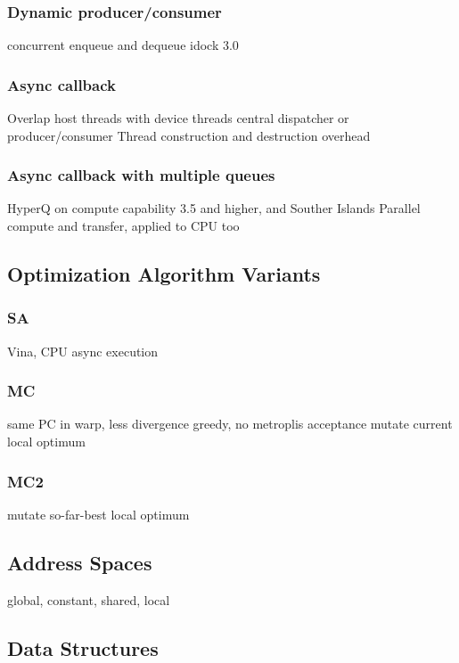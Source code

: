 \documentclass[10pt, conference, compsocconf]{../IEEEtran}
\begin{document}
\subsubsection{Dynamic producer/consumer}
concurrent enqueue and dequeue
idock 3.0

\subsubsection{Async callback}
Overlap host threads with device threads
central dispatcher or producer/consumer
Thread construction and destruction overhead

\subsubsection{Async callback with multiple queues}
HyperQ on compute capability 3.5 and higher, and Souther Islands
Parallel compute and transfer, applied to CPU too

\subsection{Optimization Algorithm Variants}

\subsubsection{SA}
Vina, CPU async execution

\subsubsection{MC}
same PC in warp, less divergence
greedy, no metroplis acceptance
mutate current local optimum

\subsubsection{MC2}
mutate so-far-best local optimum

\subsection{Address Spaces}

global, constant, shared, local

\subsection{Data Structures}
\end{document}
